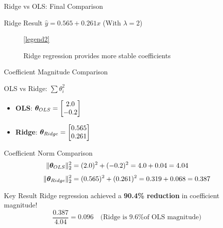 \documentclass{beamer}
\begin{document}
\begin{frame}{Ridge vs OLS: Final Comparison}
\begin{theorembox}{Ridge Result}
$\hat{y} = 0.565 + 0.261x$ \quad (With $\lambda = 2$)
\end{theorembox}

\begin{figure}
\centering
{}
\vspace{-0.3cm}
\ref{legend2}
\caption{{\small Ridge regression provides more stable coefficients}}
\end{figure}
\end{frame}

\begin{frame}{Coefficient Magnitude Comparison}
\begin{theorembox}{OLS vs Ridge: $\sum \theta_i^2$}
\begin{itemize}
\item \textbf{OLS}: $\boldsymbol{\theta}_{OLS} = \begin{bmatrix} 2.0 \\ -0.2 \end{bmatrix}$ 
\item \textbf{Ridge}: $\boldsymbol{\theta}_{Ridge} = \begin{bmatrix} 0.565 \\ 0.261 \end{bmatrix}$
\end{itemize}
\end{theorembox}
\pause

\begin{codebox}{Coefficient Norm Comparison}
\begin{align}
\|\boldsymbol{\theta}_{OLS}\|_2^2 &= (2.0)^2 + (-0.2)^2 = 4.0 + 0.04 = 4.04 \\[0.3em]
\|\boldsymbol{\theta}_{Ridge}\|_2^2 &= (0.565)^2 + (0.261)^2 = 0.319 + 0.068 = 0.387
\end{align}
\end{codebox}
\pause

\begin{alertbox}{Key Result}
Ridge regression achieved a {\bf 90.4\% reduction} in coefficient magnitude!
$$\frac{0.387}{4.04} = 0.096 \quad \text{(Ridge is 9.6\% of OLS magnitude)}$$
\end{alertbox}
\end{frame}
\end{document}
